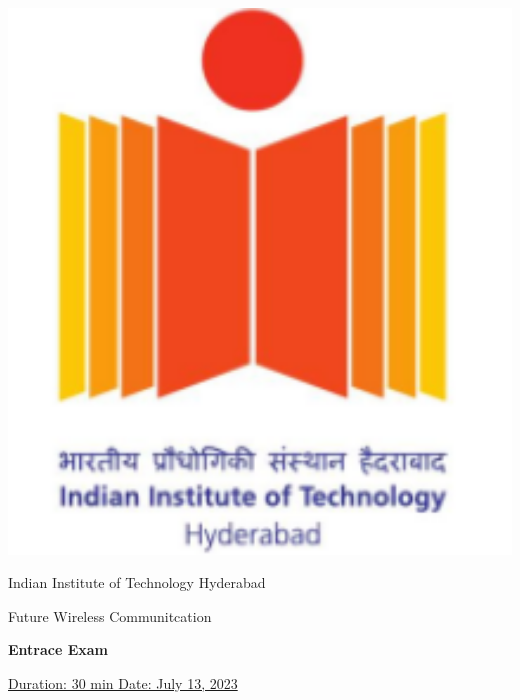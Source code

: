 \documentclass[11pt, a4paper]{exam}
\begin{document}
	\noindent
	\begin{minipage}[l]{0.1\textwidth}
		\noindent
		\includegraphics[width=1.6\textwidth]{figs/logo.png}
	\end{minipage}
\hfill
\begin{minipage}[c]{0.8\textwidth}
	\begin{center}
		\large	Indian Institute of Technology Hyderabad \par
		\large	Future Wireless Communitcation \par
	\large \textbf{Entrace Exam}%
	\end{center}
\end{minipage}
\par
\vspace{0.2in}
\noindent
\uline{Duration: 30 min \hfill Date: July 13, 2023}%
\par 
\vspace{0.15in}
\noindent
\centering
\end{document}
